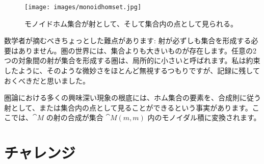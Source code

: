 \begin{figure}[H]
  \centering
  \texttt{[image: images/monoidhomset.jpg]}
  \caption{モノイドホム集合が射として、そして集合内の点として見られる。}
\end{figure}

\noindent
数学者が摘むべきちょっとした難点があります: 射が必ずしも集合を形成する必要はありません。圏の世界には、集合よりも大きいものが存在します。任意の2つの対象間の射が集合を形成する圏は、局所的に小さいと呼ばれます。私は約束したように、そのような微妙さをほとんど無視するつもりですが、記録に残しておくべきだと思いました。

圏論における多くの興味深い現象の根底には、ホム集合の要素を、合成則に従う射として、または集合内の点として見ることができるという事実があります。ここでは、$\cat{M}$ の射の合成が集合 $\cat{M}(m, m)$ 内のモノイダル積に変換されます。

\section{チャレンジ}

